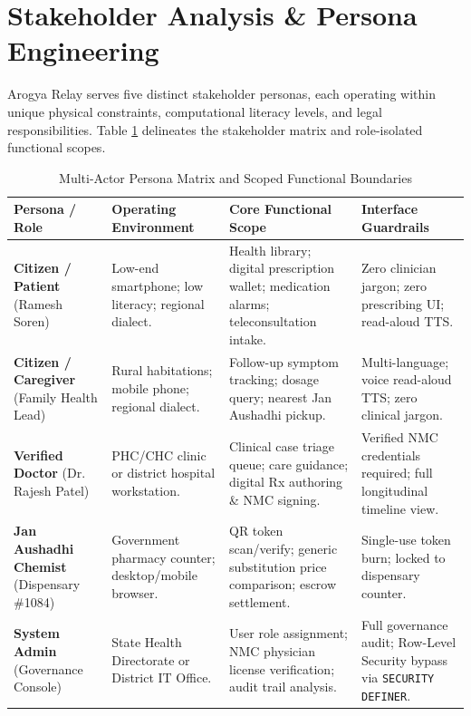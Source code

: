 \documentclass[12pt,a4paper,oneside]{report}
\begin{document}
\section{Stakeholder Analysis \& Persona Engineering}
Arogya Relay serves five distinct stakeholder personas, each operating within unique physical constraints, computational literacy levels, and legal responsibilities. Table \ref{tab:persona_matrix} delineates the stakeholder matrix and role-isolated functional scopes.

\begin{table}[!htbp]
\centering
\small
\renewcommand{\arraystretch}{1.3}
\begin{tabularx}{\textwidth}{p{2.8cm} p{2.8cm} X p{3.2cm}}
\toprule
\textbf{Persona / Role} & \textbf{Operating Environment} & \textbf{Core Functional Scope} & \textbf{Interface Guardrails} \\
\midrule
\textbf{Citizen / Patient} \newline (Ramesh Soren) & Low-end smartphone; low literacy; regional dialect. & Health library; digital prescription wallet; medication alarms; teleconsultation intake. & Zero clinician jargon; zero prescribing UI; read-aloud TTS. \\
\textbf{Citizen / Caregiver} \newline (Family Health Lead) & Rural habitations; mobile phone; regional dialect. & Follow-up symptom tracking; dosage query; nearest Jan Aushadhi pickup. & Multi-language; voice read-aloud TTS; zero clinical jargon. \\
\textbf{Verified Doctor} \newline (Dr. Rajesh Patel) & PHC/CHC clinic or district hospital workstation. & Clinical case triage queue; care guidance; digital Rx authoring \& NMC signing. & Verified NMC credentials required; full longitudinal timeline view. \\
\textbf{Jan Aushadhi Chemist} \newline (Dispensary \#1084) & Government pharmacy counter; desktop/mobile browser. & QR token scan/verify; generic substitution price comparison; escrow settlement. & Single-use token burn; locked to dispensary counter. \\
\textbf{System Admin} \newline (Governance Console) & State Health Directorate or District IT Office. & User role assignment; NMC physician license verification; audit trail analysis. & Full governance audit; Row-Level Security bypass via \texttt{SECURITY DEFINER}. \\
\bottomrule
\end{tabularx}
\caption{Multi-Actor Persona Matrix and Scoped Functional Boundaries}
\label{tab:persona_matrix}
\end{table}
\end{document}

